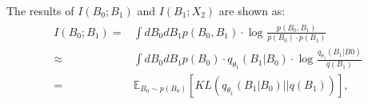 The results of $I\left ( B_{0}; B_{ 1} \right )$ and $I\left ( B_{ 1}; X_{ 2} \right )$ are shown as:
\begin{align}
\begin{aligned}
I\left ( B_{0}; B_{ 1} \right ) =& \int dB_{0}dB_{ 1} p\left (B_{0},B_{ 1} \right )\cdot \log_{}{\frac{p\left (B_{0},B_{ 1} \right )}{p\left (B_{0}\right )\cdot p\left (B_{ 1}\right )} } \\\approx& \int dB_{0}dB_{ 1} p\left ( B_{0}  \right )\cdot q_{\theta _{ 1} } \left ( B_{ 1}|B_{0} \right )\cdot \log_{}{\frac{q_{\theta _{ 1} } \left (B_{ 1}|B{0} \right )}{ q\left (B_{ 1}\right )} }\\=& \mathbb{E} _{B_0\sim p\left ( B_0 \right ) } \left [  KL\left ( q_{\theta _{ 1} } \left ( B_{ 1}|B_0 \right )||q\left ( B_{ 1} \right )   \right )  \right ], 
\end{aligned}
\end{align}